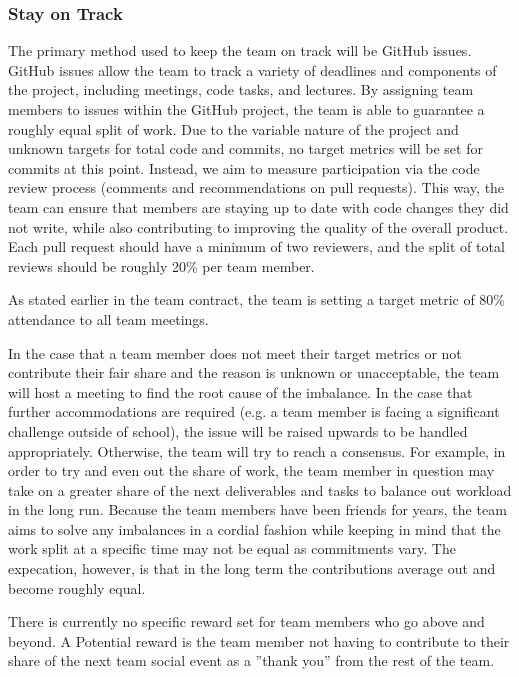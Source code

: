 \documentclass{article}
\begin{document}
\subsubsection*{Stay on Track}

The primary method used to keep the team on track will be GitHub issues. GitHub issues allow the team to track a variety of deadlines and components of the project, including meetings, code tasks, and lectures.
By assigning team members to issues within the GitHub project, the team is able to guarantee a roughly equal split of work. Due to the variable nature of the project and unknown targets for total code and commits, no target metrics will be set for commits at this point. Instead, we aim to measure participation via the code review process (comments and recommendations on pull requests). This way,
the team can ensure that members are staying up to date with code changes they did not write, while also contributing to improving the quality of the overall product. Each pull request should have a minimum of two reviewers, and the split of total reviews should be roughly 20\% per team member.

As stated earlier in the team contract, the team is setting a target metric of 80\% attendance to all team meetings. 

In the case that a team member does not meet their target metrics or not contribute their fair share and the reason is unknown or unacceptable, the team will host a meeting to find the root cause of the imbalance. In the case that further accommodations are required (e.g. a team member is facing a significant challenge outside of school), the issue will be
raised upwards to be handled appropriately. Otherwise, the team will try to reach a consensus. For example, in order to try and even out the share of work, the team member in question may take on a greater share of the next deliverables and tasks to balance out workload in the long run. Because the team members have been friends
for years, the team aims to solve any imbalances in a cordial fashion while keeping in mind that the work split at a specific time may not be equal as commitments vary. The expecation, however, is that in the long term the contributions average out and become roughly equal.

There is currently no specific reward set for team members who go above and beyond. A Potential reward is the team member not having to contribute to their share of the next team social event as a ''thank you'' from the rest of the team.
\end{document}
